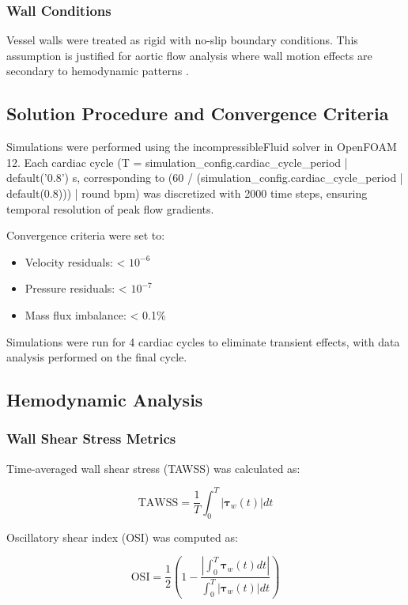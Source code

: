 \subsubsection{Wall Conditions}
Vessel walls were treated as rigid with no-slip boundary conditions. This assumption is justified for aortic flow analysis where wall motion effects are secondary to hemodynamic patterns \cite{ref_rigid_wall_assumption}.

\subsection{Solution Procedure and Convergence Criteria}

Simulations were performed using the incompressibleFluid solver in OpenFOAM 12. Each cardiac cycle (T = {{ simulation_config.cardiac_cycle_period | default('0.8') }} s, corresponding to {{ (60 / (simulation_config.cardiac_cycle_period | default(0.8))) | round }} bpm) was discretized with 2000 time steps, ensuring temporal resolution of peak flow gradients.

Convergence criteria were set to:
\begin{itemize}
    \item Velocity residuals: < $10^{-6}$
    \item Pressure residuals: < $10^{-7}$
    \item Mass flux imbalance: < 0.1\%
\end{itemize}

Simulations were run for 4 cardiac cycles to eliminate transient effects, with data analysis performed on the final cycle.

\subsection{Hemodynamic Analysis}

\subsubsection{Wall Shear Stress Metrics}
Time-averaged wall shear stress (TAWSS) was calculated as:

\begin{equation}
\text{TAWSS} = \frac{1}{T} \int_0^T |\boldsymbol{\tau}_w(t)| dt
\end{equation}

Oscillatory shear index (OSI) was computed as:

\begin{equation}
\text{OSI} = \frac{1}{2}\left(1 - \frac{\left|\int_0^T \boldsymbol{\tau}_w(t) dt\right|}{\int_0^T |\boldsymbol{\tau}_w(t)| dt}\right)
\end{equation}

